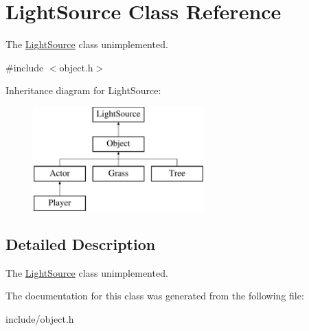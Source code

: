 \hypertarget{classLightSource}{}\section{Light\+Source Class Reference}
\label{classLightSource}


The \hyperlink{classLightSource}{Light\+Source} class unimplemented.  




{\ttfamily \#include $<$object.\+h$>$}

Inheritance diagram for Light\+Source\+:\begin{figure}[H]
\begin{center}
\leavevmode
\includegraphics[height=4.000000cm]{classLightSource}
\end{center}
\end{figure}


\subsection{Detailed Description}
The \hyperlink{classLightSource}{Light\+Source} class unimplemented. 

The documentation for this class was generated from the following file\+:\begin{DoxyCompactItemize}
\item 
include/object.\+h\end{DoxyCompactItemize}
